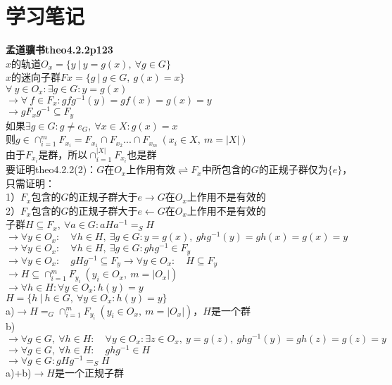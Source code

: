 \section{学习笔记}

\noindent\textbf{孟道骥书\cite{meng2010}theo4.2.2p123}\\

\noindent $x$的轨道$O_{x}=\{y\ |\ y=g(x),\ \forall g\in G\}$\\
$x$的迷向子群$Fx=\{g\ |\ g\in G,\ g(x)=x\}$\\

\noindent$\forall\ y \in O_{x}:\exists g\in G:y=g(x)$\\
$\rightarrow \forall\ f\in F_{x}:gfg^{-1}(y)=gf(x)=g(x)=y$\\
$\rightarrow gF_{x}g^{-1}\subseteq F_{y}$\\

\noindent 如果$\exists g\in G:g\neq e_{G},\ \forall x\in X:g(x)=x$\\
则$g\in \cap_{i=1}^{m} F_{x_{i}}= F_{x_{1}}\cap F_{x_{2}}...\cap F_{x_{m}} \ (x_{i}\in X,\ m=|X|)$\\
由于$F_{x_{i}}$是群，所以$\cap_{i=1}^{|X|} F_{x_{i}}$也是群\\

\noindent 要证明theo4.2.2(2)：$G$在$O_{x}$上作用有效$\rightleftharpoons$$F_{x}$中所包含的$G$的正规子群仅为$\{e\}$，只需证明：\\
1）$F_{x}$包含的$G$的正规子群大于${e}$$\rightarrow$$G$在$O_{x}$上作用不是有效的\\
2）$F_{x}$包含的$G$的正规子群大于${e}$$\leftarrow$$G$在$O_{x}$上作用不是有效的\\

\noindent 子群$H\subseteq F_{x},\ \forall a\in G:aHa^{-1}=_{S}H$\\
$\rightarrow \forall y\in O_{x}:\quad \forall h\in H,\ \exists g\in G:y=g(x),\ ghg^{-1}(y)=gh(x)=g(x)=y$\\
$\rightarrow \forall y\in O_{x}:\quad \forall h\in H,\ \exists g\in G:ghg^{-1}\in F_{y}$\\
$\rightarrow \forall y\in O_{x}:\quad gHg^{-1}\subseteq F_{y}\rightarrow \forall y\in O_{x}:\quad H\subseteq F_{y}$\\
$\rightarrow H\subseteq \cap_{i=1}^{m} F_{y_{i}}\ (y_{i}\in O_{x},\ m=|O_{x}|)$\\
$\rightarrow \forall h\in H:\forall y\in O_{x}:h(y)=y$\\

\noindent $H=\{h\ |\ h\in G,\ \forall y\in O_{x}:h(y)=y\}$\\
a)$\rightarrow H=_{G}\cap_{i=1}^{m} F_{y_{i}}\ (y_{i}\in O_{x},\ m=|O_{x}|)$，$H$是一个群\\
b)$\rightarrow\forall g\in G,\ \forall h\in H:\quad\forall y\in O_{x}:\exists z\in O_{x},\ y=g(z),\ ghg^{-1}(y)=gh(z)=g(z)=y$\\
$\rightarrow\forall g\in G,\ \forall h\in H:\quad ghg^{-1}\in H$\\
$\rightarrow\forall g\in G:gHg^{-1}=_{S}H$\\
a)+b)$\rightarrow H$是一个正规子群\\

